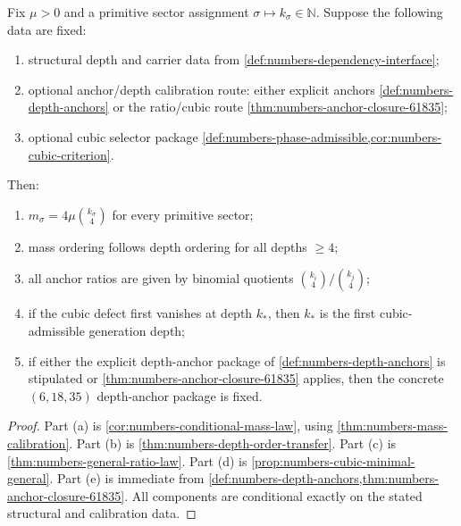 \begin{theorem}
\label{thm:numbers-integrated-closure}
Fix \(\mu>0\) and a primitive sector assignment
\(\sigma\mapsto k_\sigma\in\mathbb N\).
Suppose the following data are fixed:
\begin{enumerate}[label=\textup{(\roman*)}]
\item
      structural depth and carrier data from
      \cref{def:numbers-dependency-interface};
\item
      optional anchor/depth calibration route: either explicit anchors
      \cref{def:numbers-depth-anchors} or the ratio/cubic route
      \cref{thm:numbers-anchor-closure-61835};
\item
      optional cubic selector package
      \cref{def:numbers-phase-admissible,cor:numbers-cubic-criterion}.
\end{enumerate}
Then:
\begin{enumerate}[label=\textup{(\alph*)}]
\item
      \(m_\sigma=4\mu\binom{k_\sigma}{4}\) for every primitive sector;
\item
      mass ordering follows depth ordering for all depths \(\ge4\);
\item
      all anchor ratios are given by binomial quotients
      \(\binom{k_i}{4}/\binom{k_j}{4}\);
\item
      if the cubic defect first vanishes at depth \(k_\ast\), then
      \(k_\ast\) is the first cubic-admissible generation depth;
\item
      if either the explicit depth-anchor package of
      \cref{def:numbers-depth-anchors} is stipulated or
      \cref{thm:numbers-anchor-closure-61835} applies, then the concrete
      \((6,18,35)\) depth-anchor package is fixed.
\end{enumerate}
\end{theorem}

\begin{proof}
Part (a) is \cref{cor:numbers-conditional-mass-law}, using
\cref{thm:numbers-mass-calibration}.
Part (b) is \cref{thm:numbers-depth-order-transfer}.
Part (c) is \cref{thm:numbers-general-ratio-law}.
Part (d) is \cref{prop:numbers-cubic-minimal-general}.
Part (e) is immediate from
\cref{def:numbers-depth-anchors,thm:numbers-anchor-closure-61835}.
All components are conditional exactly on the stated structural and
calibration data.
\end{proof}

